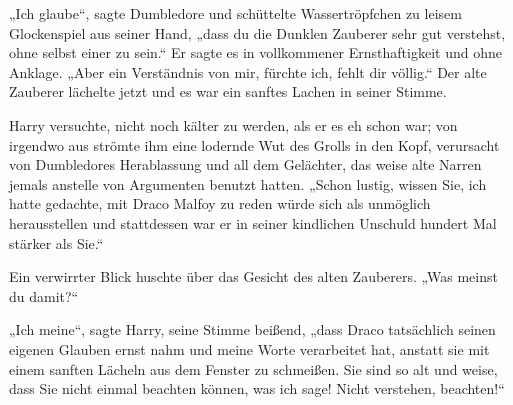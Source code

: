 „Ich glaube“, sagte Dumbledore und schüttelte Wassertröpfchen zu leisem Glockenspiel aus seiner Hand, „dass du die Dunklen Zauberer sehr gut verstehst, ohne selbst einer zu sein.“ Er sagte es in vollkommener Ernsthaftigkeit und ohne Anklage.
„Aber ein Verständnis von mir, fürchte ich, fehlt dir völlig.“ Der alte Zauberer lächelte jetzt und es war ein sanftes Lachen in seiner Stimme.

Harry versuchte, nicht noch kälter zu werden, als er es eh schon war; von irgendwo aus strömte ihm eine lodernde Wut des Grolls in den Kopf, verursacht von Dumbledores Herablassung und all dem Gelächter, das weise alte Narren jemals anstelle von Argumenten benutzt hatten.
„Schon lustig, wissen Sie, ich hatte gedachte, mit Draco Malfoy zu reden würde sich als unmöglich herausstellen und stattdessen war er in seiner kindlichen Unschuld hundert Mal stärker als Sie.“

Ein verwirrter Blick huschte über das Gesicht des alten Zauberers.
„Was meinst du damit?“

„Ich meine“, sagte Harry, seine Stimme beißend, „dass Draco tatsächlich seinen eigenen Glauben ernst nahm und meine Worte verarbeitet hat, anstatt sie mit einem sanften Lächeln aus dem Fenster zu schmeißen. Sie sind so alt und weise, dass Sie nicht einmal beachten können, was ich sage! Nicht verstehen, beachten!“

